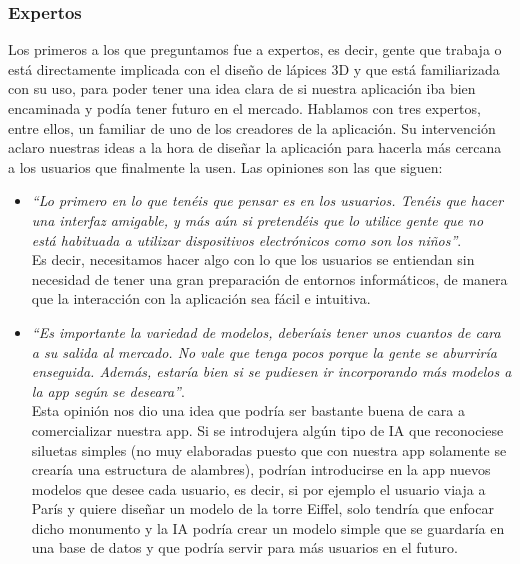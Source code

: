 \documentclass[12pt,a4paper]{article}
\begin{document}
\subsubsection{Expertos}
Los primeros a los que preguntamos fue a expertos, es decir, gente que trabaja o está directamente implicada con el diseño de lápices 3D y que está familiarizada con su uso, para poder tener una idea clara de si nuestra aplicación iba bien encaminada y podía tener futuro en el mercado. Hablamos con tres expertos, entre ellos, un familiar de uno de los creadores de la aplicación. Su intervención aclaro nuestras ideas a la hora de diseñar la aplicación para hacerla más cercana a los usuarios que finalmente la usen. Las opiniones son las que siguen:

\begin{itemize}
    \item \textit{``Lo primero en lo que tenéis que pensar es en los usuarios. Tenéis que hacer una interfaz amigable, y más aún si pretendéis que lo utilice gente que no está habituada a utilizar dispositivos electrónicos como son los niños''}.\\
    
    Es decir,  necesitamos hacer algo con lo que los usuarios se entiendan sin necesidad de tener una gran preparación de entornos informáticos, de manera que la interacción con la aplicación sea fácil e intuitiva.\\
    
    \item \textit{``Es importante la variedad de modelos, deberíais tener unos cuantos de cara a su salida al mercado. No vale que tenga pocos porque la gente se aburriría enseguida. Además, estaría bien si se pudiesen ir incorporando más modelos a la app según se deseara''}.\\
    
    Esta opinión nos dio una idea que podría ser bastante buena de cara a comercializar nuestra app. Si se introdujera algún tipo de IA que reconociese siluetas simples (no muy elaboradas puesto que con nuestra app solamente se crearía una estructura de alambres), podrían introducirse en la app nuevos modelos que desee cada usuario, es decir, si por ejemplo el usuario viaja a París y quiere diseñar un modelo de la torre Eiffel, solo tendría que enfocar dicho monumento y la IA podría crear un modelo simple que se guardaría en una base de datos y que podría servir para más usuarios en el futuro.\\
    

\end{itemize}
\end{document}
